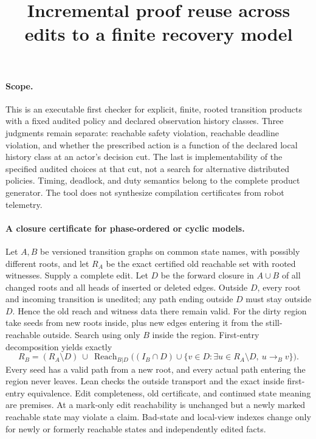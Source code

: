 \documentclass{article}
\title{Incremental proof reuse across edits to a finite recovery model}
\author{}\date{}
\begin{document}
\maketitle

\paragraph{Scope.}
This is an executable first checker for explicit, finite, rooted transition
products with a fixed audited policy and declared observation history
classes. Three judgments remain separate: reachable safety violation,
reachable deadline violation, and whether the prescribed action is a
function of the declared local history class at an actor's decision cut.
The last is implementability of the specified audited choices at that cut,
not a search for alternative distributed policies. Timing, deadlock,
and duty semantics belong to the complete product generator. The tool
does not synthesize compilation certificates from robot telemetry.

\paragraph{A closure certificate for phase-ordered or cyclic models.}
Let $A,B$ be versioned transition graphs on common state names, with
possibly different roots, and let $R_A$ be the exact certified old reachable
set with rooted witnesses. Supply a complete edit. Let $D$ be the forward
closure in $A\cup B$ of all changed roots and all heads of inserted or
deleted edges. Outside $D$, every root and incoming transition is unedited;
any path ending outside $D$ must stay outside $D$. Hence the old reach
and witness data there remain valid. For the dirty region take seeds
from new roots inside, plus new edges entering it from the still-reachable
outside. Search using only $B$ inside the region. First-entry decomposition
yields exactly
\[
 R_B=(R_A\setminus D)\ \cup\
 \operatorname{Reach}_{B|D}
 \bigl((I_B\cap D)\cup\{v\in D:\exists u\in R_A\setminus D,\ u\to_B v\}\bigr).
\]
Every seed has a valid path from a new root, and every actual path entering
the region never leaves. Lean checks the outside transport and the exact
inside first-entry equivalence. Edit completeness, old certificate,
and continued state meaning are premises. At a mark-only edit reachability
is unchanged but a newly marked reachable state may violate a claim.
Bad-state and local-view indexes change only for newly or formerly reachable
states and independently edited facts.
\end{document}
